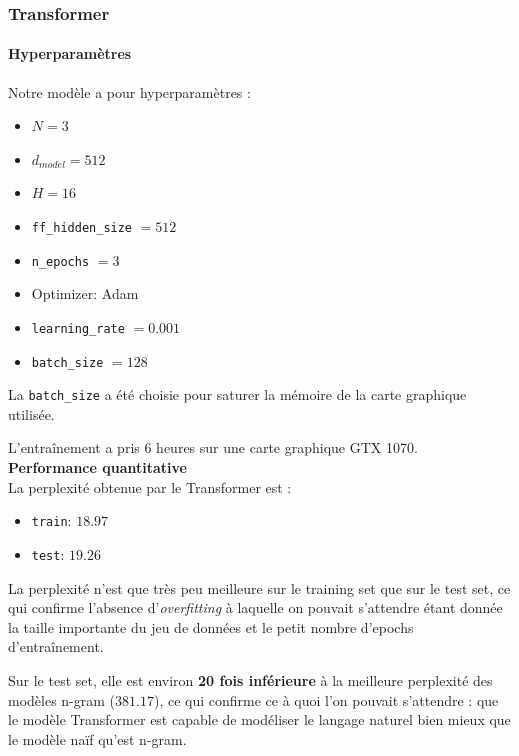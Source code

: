 \hypertarget{transformer}{%
\subsubsection{Transformer}\label{transformer}}

\paragraph{Hyperparamètres}

Notre modèle a pour hyperparamètres :

\begin{itemize}
\item
  \(N = 3\)
\item
  \(d_{model} = 512\)
\item
  \(H = 16\)
\item
  \texttt{ff\_hidden\_size} $ = 512$
\item
  \texttt{n\_epochs} $ = 3$
\item
  Optimizer: Adam
\item
  \texttt{learning\_rate} $ = 0.001 $
\item
  \texttt{batch\_size} $ = 128$
\end{itemize}

La \texttt{batch\_size} a été choisie pour saturer la mémoire de la
carte graphique utilisée.

L'entraînement a pris 6 heures sur une carte graphique GTX 1070. \\

\noindent{}\textbf{Performance quantitative} \\

La perplexité obtenue par le Transformer est :

\begin{itemize}
\item
  \texttt{train}: \(18.97\)
\item
  \texttt{test}: \(19.26\)
\end{itemize}

La perplexité n'est que très peu meilleure sur le training set que sur
le test set, ce qui confirme l'absence d'\textit{overfitting} à laquelle
on pouvait s'attendre étant donnée la taille importante du jeu de
données et le petit nombre d'epochs d'entraînement.

Sur le test set, elle est environ \textbf{20 fois inférieure} à la
meilleure perplexité des modèles n-gram (\(381.17\)), ce qui confirme ce
à quoi l'on pouvait s'attendre : que le modèle Transformer est capable
de modéliser le langage naturel bien mieux que le modèle naïf qu'est
n-gram. \\

